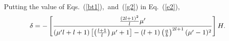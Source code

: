 Putting the value of Eqs.~(\ref{bt1}),~and~(\ref{g2}) in Eq.~(\ref{e2}),
\begin{equation}\label{dt1}
\delta =-\left[\frac{\frac{(2l+1)^2}{l}\mu'}{(\mu'l+l+1)\left[\left(\frac{l+1}{l}\right)\mu'+1\right]-(l+1)\left(\frac{a}{b}\right)^{2l+1}(\mu'-1)^2}\right]H{\rm .}    
\end{equation}






